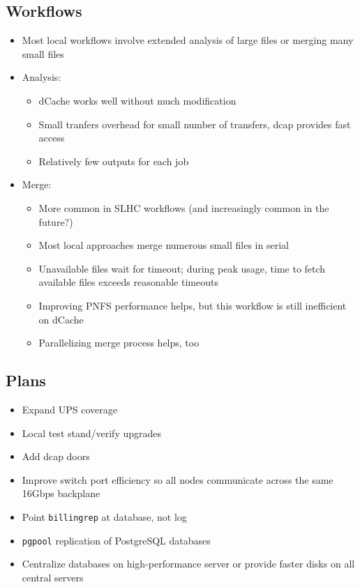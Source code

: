 \documentclass{beamer}
\begin{document}
\subsection{Workflows}
\begin{frame}
\begin{itemize}
	\item Most local workflows involve extended analysis of large files or merging many small files
	\item Analysis:
	\begin{itemize}
		\item dCache works well without much modification
		\item Small tranfers overhead for small number of transfers, dcap provides fast access
		\item Relatively few outputs for each job
	\end{itemize}
	\item Merge:
	\begin{itemize}
		\item More common in SLHC workflows (and increasingly common in the future?)
		\item Most local approaches merge numerous small files in serial
		\item Unavailable files wait for timeout; during peak usage, time to fetch available files exceeds reasonable timeouts
		\item Improving PNFS performance helps, but this workflow is still inefficient on dCache
		\item Parallelizing merge process helps, too
	\end{itemize}
\end{itemize}
\end{frame}

\subsection{Plans}
\begin{frame}
\begin{itemize}
	\item Expand UPS coverage
	\item Local test stand/verify upgrades
	\item Add dcap doors
	\item Improve switch port efficiency so all nodes communicate across the same 16Gbps backplane
	\item Point {\tt billingrep} at database, not log
	\item {\tt pgpool} replication of PostgreSQL databases
	\item Centralize databases on high-performance server or provide faster disks on all central servers
\end{itemize}
\end{frame}
\end{document}
